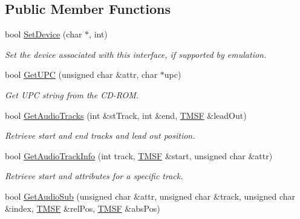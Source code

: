 \subsection*{Public Member Functions}
\begin{DoxyCompactItemize}
\item 
\hypertarget{classCDROM__Interface__Fake_a344218a4e5ac24ad7ea549a6440e9e19}{bool \hyperlink{classCDROM__Interface__Fake_a344218a4e5ac24ad7ea549a6440e9e19}{Set\-Device} (char $\ast$, int)}\label{classCDROM__Interface__Fake_a344218a4e5ac24ad7ea549a6440e9e19}

\begin{DoxyCompactList}\small\item\em Set the device associated with this interface, if supported by emulation. \end{DoxyCompactList}\item 
\hypertarget{classCDROM__Interface__Fake_a3304c3e7cd241800d4bcba5faf888f96}{bool \hyperlink{classCDROM__Interface__Fake_a3304c3e7cd241800d4bcba5faf888f96}{Get\-U\-P\-C} (unsigned char \&attr, char $\ast$upc)}\label{classCDROM__Interface__Fake_a3304c3e7cd241800d4bcba5faf888f96}

\begin{DoxyCompactList}\small\item\em Get U\-P\-C string from the C\-D-\/\-R\-O\-M. \end{DoxyCompactList}\item 
\hypertarget{classCDROM__Interface__Fake_a14881cfccb40e1cd1e00293a43ede7cd}{bool \hyperlink{classCDROM__Interface__Fake_a14881cfccb40e1cd1e00293a43ede7cd}{Get\-Audio\-Tracks} (int \&st\-Track, int \&end, \hyperlink{structSMSF}{T\-M\-S\-F} \&lead\-Out)}\label{classCDROM__Interface__Fake_a14881cfccb40e1cd1e00293a43ede7cd}

\begin{DoxyCompactList}\small\item\em Retrieve start and end tracks and lead out position. \end{DoxyCompactList}\item 
\hypertarget{classCDROM__Interface__Fake_a13b02db8a3ee1fd99124d5dfd5508021}{bool \hyperlink{classCDROM__Interface__Fake_a13b02db8a3ee1fd99124d5dfd5508021}{Get\-Audio\-Track\-Info} (int track, \hyperlink{structSMSF}{T\-M\-S\-F} \&start, unsigned char \&attr)}\label{classCDROM__Interface__Fake_a13b02db8a3ee1fd99124d5dfd5508021}

\begin{DoxyCompactList}\small\item\em Retrieve start and attributes for a specific track. \end{DoxyCompactList}\item 
\hypertarget{classCDROM__Interface__Fake_a28034819e3365729f6bdef40c4cf940a}{bool \hyperlink{classCDROM__Interface__Fake_a28034819e3365729f6bdef40c4cf940a}{Get\-Audio\-Sub} (unsigned char \&attr, unsigned char \&track, unsigned char \&index, \hyperlink{structSMSF}{T\-M\-S\-F} \&rel\-Pos, \hyperlink{structSMSF}{T\-M\-S\-F} \&abs\-Pos)}\label{classCDROM__Interface__Fake_a28034819e3365729f6bdef40c4cf940a}


\end{DoxyCompactItemize}
